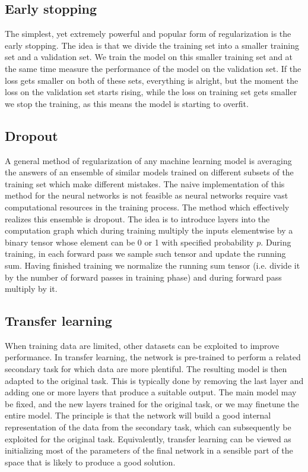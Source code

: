\documentclass[a5paper]{article}
\begin{document}
\subsection{Early stopping}

The simplest, yet extremely powerful and popular form of regularization is the early stopping. The
idea is that we divide the training set into a smaller training set and a validation set. We train
the model on this smaller training set and at the same time measure the performance of the model on
the validation set. If the loss gets smaller on both of these sets, everything is alright, but the
moment the loss on the validation set starts rising, while the loss on training set gets smaller we
stop the training, as this means the model is starting to overfit.


\subsection{Dropout}

A general method of regularization of any machine learning model is averaging the answers of an
ensemble of similar models trained on different subsets of the training set which make different
mistakes. The naive implementation of this method for the neural networks is not feasible as neural
networks require vast computational resources in the training process. The method which effectively
realizes this ensemble is dropout. The idea is to introduce layers into the computation graph which
during training multiply the inputs elementwise by a binary tensor whose element can be 0 or 1 with
specified probability \(p\). During training, in each forward pass we sample such tensor and update
the running sum. Having finished training we normalize the running sum tensor (i.e. divide it by the
number of forward passes in training phase) and during forward pass multiply by it.


\subsection{Transfer learning}

When training data are limited, other datasets can be exploited to improve performance. In transfer
learning, the network is pre-trained to perform a related secondary task for which data are more
plentiful. The resulting model is then adapted to the original task. This is typically done by
removing the last layer and adding one or more layers that produce a suitable output. The main model
may be fixed, and the new layers trained for the original task, or we may finetune the entire model.
The principle is that the network will build a good internal representation of the data from the
secondary task, which can subsequently be exploited for the original task. Equivalently, transfer
learning can be viewed as initializing most of the parameters of the final network in a sensible
part of the space that is likely to produce a good solution.
\end{document}
